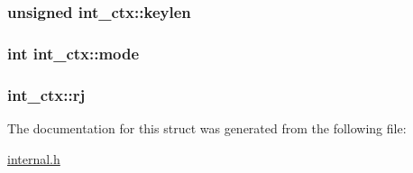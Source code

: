 \hypertarget{structint__ctx_aa09fedf5414ec886700046bb5b52e9ec}{
\subsubsection[{keylen}]{\setlength{\rightskip}{0pt plus 5cm}unsigned int\-\_\-ctx\-::keylen}}\label{structint__ctx_aa09fedf5414ec886700046bb5b52e9ec}
\hypertarget{structint__ctx_a02e9a0634da59d3a196f14dcaed77df7}{
\subsubsection[{mode}]{\setlength{\rightskip}{0pt plus 5cm}int int\-\_\-ctx\-::mode}}\label{structint__ctx_a02e9a0634da59d3a196f14dcaed77df7}
\hypertarget{structint__ctx_ae6455e9eaa34ec09871fa52ec7becb77}{
\subsubsection[{rj}]{ int\-\_\-ctx\-::rj}}\label{structint__ctx_ae6455e9eaa34ec09871fa52ec7becb77}


The documentation for this struct was generated from the following file\-:\begin{DoxyCompactItemize}
\item 
\hyperlink{internal_8h}{internal.\-h}\end{DoxyCompactItemize}
